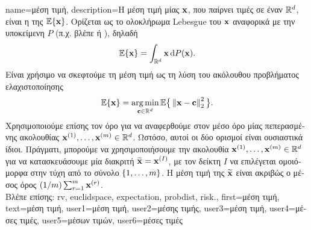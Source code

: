{name={\foreignlanguage{greek}{μέση τιμή}},
	description={\foreignlanguage{greek}{Η μέση τιμή μίας} 
		 ${\bf x}$, \foreignlanguage{greek}{που παίρνει τιμές σε έναν}  $\mathbb{R}^{d}$, 
		\foreignlanguage{greek}{είναι η}  \foreignlanguage{greek}{της}
 		$\mathbb{E}\{{\bf x}\}$. \foreignlanguage{greek}{Ορίζεται ως το ολοκλήρωμα} Lebesgue \foreignlanguage{greek}{του} ${\bf x}$ 
		\foreignlanguage{greek}{αναφορικά με την υποκείμενη}  $P$ (\foreignlanguage{greek}{π.χ. βλέπε} 
		\cite{RudinBookPrinciplesMatheAnalysis} \foreignlanguage{greek}{ή} \cite{BillingsleyProbMeasure}), \foreignlanguage{greek}{δηλαδή}
		\[
			\mathbb{E}\{{\bf x}\} = \int_{\mathbb{R}^{d}} {\bf x} \, \mathrm{d}P({\bf x}).
		\] 
		\foreignlanguage{greek}{Είναι χρήσιμο να σκεφτούμε τη μέση τιμή ως τη λύση του ακόλουθου προβλήματος 
		ελαχιστοποίησης}  \cite{BertsekasProb}
		\[
			\mathbb{E}\{{\bf x}\} = \operatorname*{arg\,min}_{{\bf c} \in \mathbb{R}^{d}} 
			\mathbb{E} \big\{\left\Vert {{\bf x}- {\bf c}} \right\Vert_{2}^{2}\big \}.
		\] 
		\foreignlanguage{greek}{Χρησιμοποιούμε επίσης τον όρο για να αναφερθούμε στον μέσο όρο μίας πεπερασμένης ακολουθίας  
		${\bf x}^{(1)}, \ldots, {\bf x}^{(m)} \in \mathbb{R}^{d}$. Ωστόσο, 
		αυτοί οι δύο ορισμοί είναι ουσιαστικά ίδιοι. Πράγματι, μπορούμε να χρησιμοποιήσουμε την ακολουθία  
		${\bf x}^{(1)}, \ldots, {\bf x}^{(m)} \in \mathbb{R}^{d}$ για να κατασκευάσουμε μία διακριτή}  $\widetilde{{\bf x}}={\bf x}^{(I)}$, 
		\foreignlanguage{greek}{με τον δείκτη $I$ να επιλέγεται ομοιόμορφα στην τύχη από το σύνολο 
		$\{1, \ldots, m\}$. Η μέση τιμή της $\widetilde{{\bf x}}$ είναι ακριβώς ο μέσος όρος}
		$({1}/{m}) \sum_{r=1}^{m} {\bf x}^{(r)}$.\\
		\foreignlanguage{greek}{Βλέπε επίσης:} \gls{rv}, \gls{euclidspace}, \gls{expectation}, \gls{probdist}, \gls{risk}.}, 
	first={\foreignlanguage{greek}{μέση τιμή}}, 
	text={\foreignlanguage{greek}{μέση τιμή}},
	user1={\foreignlanguage{greek}{μέση τιμή}}, %
   	user2={\foreignlanguage{greek}{μέσης τιμής}}, %
	user3={\foreignlanguage{greek}{μέση τιμή}}, %
	user4={\foreignlanguage{greek}{μέσες τιμές}}, %
   	user5={\foreignlanguage{greek}{μέσων τιμών}}, %
	user6={\foreignlanguage{greek}{μέσες τιμές}} %
}

